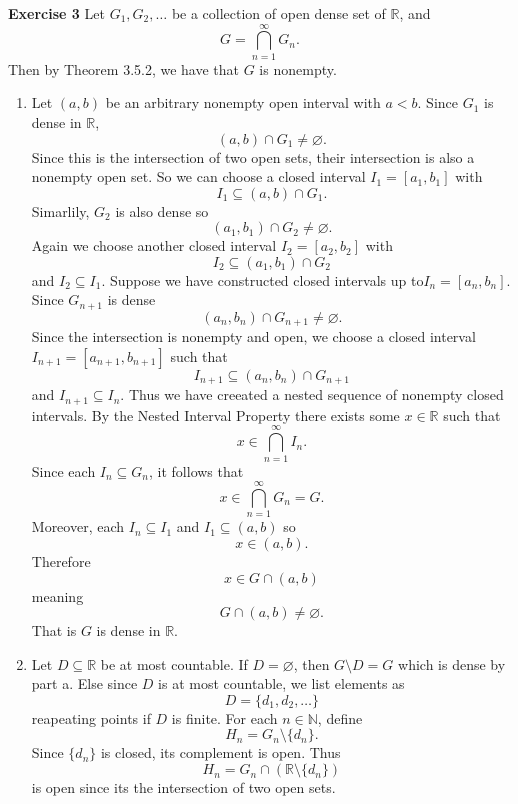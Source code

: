 \documentclass[12pt]{article}
\begin{document}
\textbf{Exercise 3}
Let \( G_1,G_2, \dots  \) be a collection of open dense set of \( \mathbb{R} \), and
\[
    G = \bigcap_{n=1}^{\infty} G_n.
\]
Then by Theorem 3.5.2, we have that \( G \) is nonempty.
\begin{enumerate}[label=(\alph*)]
    \item
          Let \( (a,b) \) be an arbitrary nonempty open interval with \( a < b \). Since \( G_1 \) is dense in \( \mathbb{R} \),
          \[
              (a,b) \cap G_1 \neq \varnothing.
          \]
          Since this is the intersection of two open sets, their intersection is also a nonempty open set. So we can choose a closed interval \( I_1 = [a_1, b_1] \) with
          \[
              I_1 \subseteq (a,b) \cap G_1.
          \]
          Simarlily, \( G_2 \) is also dense so
          \[
              (a_1,b_1) \cap G_2 \neq \varnothing.
          \]
          Again we choose another closed interval \( I_2 = [a_2, b_2] \) with
          \[
              I_2 \subseteq (a_1,b_1) \cap G_2
          \]
          and \( I_2 \subseteq I_1 \). Suppose we have constructed closed intervals up to\( I_n = [a_n, b_n] \). Since \( G_{n+1} \) is dense
          \[
              (a_n, b_n) \cap G_{n+1} \neq \varnothing.
          \]
          Since the intersection is nonempty and open, we choose a closed interval \( I_{n+1} = [a_{n+1}, b_{n+1}]\) such that
          \[
              I_{n+1} \subseteq (a_{n}, b_n) \cap  G_{n+1}
          \]
          and \( I_{n+1} \subseteq I_n \). Thus we have creeated a nested sequence of nonempty closed intervals. By the Nested Interval Property there exists some \( x \in \mathbb{R} \) such that
          \[
              x \in \bigcap_{n=1}^{\infty} I_n.
          \]
          Since each \( I_n \subseteq G_n \), it follows that
          \[
              x \in \bigcap_{n=1}^{\infty} G_n = G.
          \]
          Moreover, each \( I_n \subseteq I_1 \) and \( I_1 \subseteq (a,b) \) so
          \[
              x \in (a,b).
          \]
          Therefore
          \[
              x \in G \cap (a,b)
          \]
          meaning
          \[
              G \cap (a,b) \neq \varnothing.
          \]
          That is \( G \) is dense in \( \mathbb{R} \).


    \item Let \( D \subseteq \mathbb{R} \) be at most countable. If \( D = \varnothing \), then \( G \setminus D = G\) which is dense by part a. Else since \( D \) is at most countable, we list elements as
          \[
              D = \{d_1, d_2, \dots \}
          \]
          reapeating points if \( D \) is finite.
          For each \( n \in \mathbb{N} \), define
          \[
              H_n = G_n \setminus \{d_n\}.
          \]
          Since \( \{d_n\} \) is closed, its complement is open.
          Thus
          \[
              H_n = G_{n} \cap (\mathbb{R} \setminus \{d_n\})
          \]
          is open since its the intersection of two open sets.


\end{enumerate}
\end{document}
